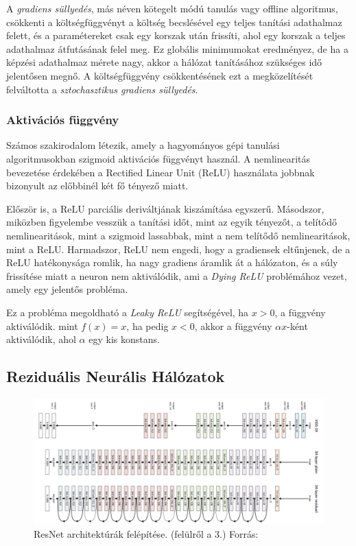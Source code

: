 \documentclass[12pt,a4]{article}
\begin{document}
	A \textit{gradiens süllyedés}, más néven kötegelt módú tanulás vagy offline algoritmus, csökkenti a költségfüggvényt a költség becslésével egy teljes tanítási adathalmaz felett, és a paramétereket csak egy korszak után frissíti, ahol egy korszak a teljes adathalmaz átfutásának felel meg.
	Ez globális minimumokat eredményez, de ha a képzési adathalmaz mérete nagy, akkor a hálózat tanításához szükséges idő
	jelentősen megnő. A költségfüggvény csökkentésének ezt a megközelítését felváltotta a \textit{sztochasztikus gradiens süllyedés}.
 
	\subsubsection{Aktivációs függvény}
	
	Számos szakirodalom létezik, amely a hagyományos gépi tanulási algoritmusokban
	szigmoid aktivációs függvényt használ.
	A nemlinearitás bevezetése érdekében a Rectified Linear Unit (ReLU) használata jobbnak bizonyult az előbbinél
	két fő tényező miatt. 
	
	Először is, a ReLU parciális deriváltjának kiszámítása egyszerű. 
	Másodszor, miközben figyelembe vesszük
	a tanítási időt, mint az egyik tényezőt, a telítődő nemlinearitások, mint a szigmoid lassabbak, mint a nem telítődő nemlinearitások, mint a ReLU.
	 Harmadszor, ReLU nem engedi, hogy a gradiensek eltűnjenek, de a ReLU hatékonysága romlik, ha nagy gradiens áramlik át a hálózaton, és a súly frissítése miatt a neuron nem aktiválódik, ami a \textit{Dying ReLU} problémához vezet, amely egy jelentős probléma. 
	 
	 Ez a probléma megoldható a \textit{Leaky ReLU} segítségével, ha $x>0$, a függvény aktiválódik.
	mint $f(x)= x$, ha pedig $x<0$, akkor a függvény $\alpha x$-ként aktiválódik, ahol $\alpha$ egy kis konstans.

    \subsection{Reziduális Neurális Hálózatok}
    
    \begin{figure}[h]	
 		\centering
 		\includegraphics[width=1\linewidth]{ResNet}
 		\caption{ResNet architektúrák felépítése. (felülről a 3.)
 			Forrás: \cite{resnet}}
        \label{fig:resnet}
 	\end{figure}
    
\end{document}
